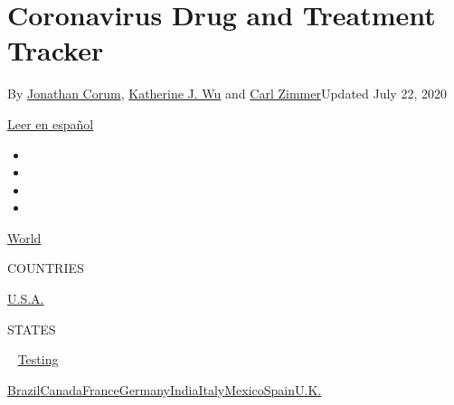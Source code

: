\hypertarget{coronavirus-drug-and-treatment-tracker}{%
\section{Coronavirus Drug and Treatment
Tracker}\label{coronavirus-drug-and-treatment-tracker}}

By \href{https://www.nytimes.com/by/jonathan-corum}{Jonathan Corum},
\href{https://www.nytimes.com/by/katherine-j--wu}{Katherine J. Wu} and
\href{https://www.nytimes.com/by/carl-zimmer}{Carl Zimmer}Updated July
22, 2020

\href{https://www.nytimes.com/es/interactive/2020/science/coronavirus-tratamientos-curas.html}{Leer
en español}

\begin{itemize}
\item
\item
\item
\item
\end{itemize}

\href{https://www.nytimes.com/interactive/2020/world/coronavirus-maps.html}{World}~

COUNTRIES

\textbar{}
\href{https://www.nytimes.com/interactive/2020/us/coronavirus-us-cases.html}{U.S.A.}~

STATES

~
\href{https://www.nytimes.com/interactive/2020/us/coronavirus-testing.html}{Testing}

\href{https://www.nytimes.com/interactive/2020/world/americas/brazil-coronavirus-cases.html}{Brazil}\href{https://www.nytimes.com/interactive/2020/world/canada/canada-coronavirus-cases.html}{Canada}\href{https://www.nytimes.com/interactive/2020/world/europe/france-coronavirus-cases.html}{France}\href{https://www.nytimes.com/interactive/2020/world/europe/germany-coronavirus-cases.html}{Germany}\href{https://www.nytimes.com/interactive/2020/world/asia/india-coronavirus-cases.html}{India}\href{https://www.nytimes.com/interactive/2020/world/europe/italy-coronavirus-cases.html}{Italy}\href{https://www.nytimes.com/interactive/2020/world/americas/mexico-coronavirus-cases.html}{Mexico}\href{https://www.nytimes.com/interactive/2020/world/europe/spain-coronavirus-cases.html}{Spain}\href{https://www.nytimes.com/interactive/2020/world/europe/united-kingdom-coronavirus-cases.html}{U.K.}


